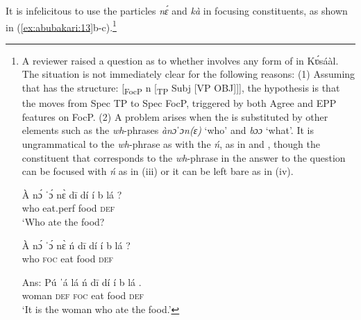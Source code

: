 \documentclass[output=paper
,newtxmath
,modfonts
,nonflat]{langsci/langscibook}
\begin{document}
 It is infelicitous to use the particles \textit{nɛ́} and \textit{kà} in focusing  constituents, as shown in (\ref{ex:abubakari:13}b-c).\footnote{A 
    reviewer raised a question as to whether   involves any form of  in Kʋ́sáàl. The situation is not immediately clear for the following reasons: 
    (1) Assuming that   has the structure: [\textsubscript{FocP} n [\textsubscript{TP} Subj [VP OBJ]]], the hypothesis is that the  moves from Spec TP to Spec FocP, triggered by both Agree and EPP features on FocP. 
    (2) A problem arises when the  is substituted by other elements such as the \textit{wh}-phrases \textit{ànɔˈ}\textit{ɔn(ɛ)} ‘who’ and \textit{bɔɔ} ‘what’. It is ungrammatical to  the \textit{wh}-phrase as  with the   \textit{ń}, as in  and , though the constituent that corresponds to the \textit{wh}-phrase in the answer to the question can be focused with \textit{ń} as in (iii) or it can be left bare as in (iv).
    
      \ea
      \gll \`{A} n\'{ɔ} ˈ\'{ɔ} n\`{ɛ}   d\={i}     d\'{i} \'{i} b  l\'{a} ?     \\
      who    eat.perf   food   \textsc{def}    \\
      \glt ‘Who ate the food?                            
      \z
      
      \ea\label{ex:abubakari:fnii}
      \gll *\`{A} n\'{ɔ} ˈ\'{ɔ} n\`{ɛ}   \'{n}   d\={i}   d\'{i} \'{i} b  l\'{a} ?    \\
      who  \textsc{foc}  eat  food   \textsc{def}                            \\
      \z
      
      \ea
      \gll Ans: P\'{u} ˈ\'{a}     l\'{a}   \'{n}    d\={i}   d\'{i} \'{i} b  l\'{a} . \\
      woman  \textsc{def}  \textsc{foc}  eat  food   \textsc{def} \\
      \glt ‘It is the woman who ate the food.’                          
      \z
      
}
\end{document}
